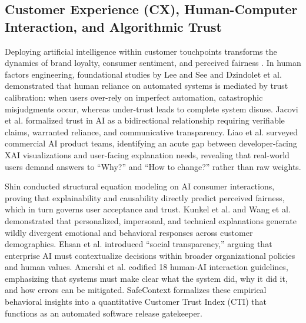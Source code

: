 \documentclass[journal]{IEEEtran}
\begin{document}
\subsection{Customer Experience (CX), Human-Computer Interaction, and Algorithmic Trust}
Deploying artificial intelligence within customer touchpoints transforms the dynamics of brand loyalty, consumer sentiment, and perceived fairness \cite{chi2022user, amershi2019guidelines}. In human factors engineering, foundational studies by Lee and See \cite{lee2004trust} and Dzindolet et al. \cite{dzindolet2003role} demonstrated that human reliance on automated systems is mediated by trust calibration: when users over-rely on imperfect automation, catastrophic misjudgments occur, whereas under-trust leads to complete system disuse. Jacovi et al. \cite{jacovi2021formalizing} formalized trust in AI as a bidirectional relationship requiring verifiable claims, warranted reliance, and communicative transparency. Liao et al. \cite{liao2020questioning} surveyed commercial AI product teams, identifying an acute gap between developer-facing XAI visualizations and user-facing explanation needs, revealing that real-world users demand answers to ``Why?'' and ``How to change?'' rather than raw weights.

Shin \cite{shin2021effects} conducted structural equation modeling on AI consumer interactions, proving that explainability and causability directly predict perceived fairness, which in turn governs user acceptance and trust. Kunkel et al. \cite{kunkel2019let} and Wang et al. \cite{wang2019designing} demonstrated that personalized, impersonal, and technical explanations generate wildly divergent emotional and behavioral responses across customer demographics. Ehsan et al. \cite{ehsan2021expanding} introduced ``social transparency,'' arguing that enterprise AI must contextualize decisions within broader organizational policies and human values. Amershi et al. \cite{amershi2019guidelines} codified 18 human-AI interaction guidelines, emphasizing that systems must make clear what the system did, why it did it, and how errors can be mitigated. SafeContext formalizes these empirical behavioral insights into a quantitative Customer Trust Index (CTI) that functions as an automated software release gatekeeper.
\end{document}
